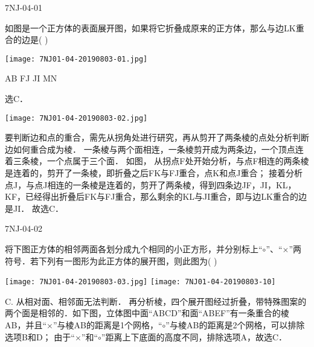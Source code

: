 
\begin{defproblem}{7NJ-04-01}%
\begin{onlyproblem}%
如图是一个正方体的表面展开图，如果将它折叠成原来的正方体，那么与边LK重合的边是(    ) 
\begin{center}
\texttt{[image: 7NJ01-04-20190803-01.jpg]}
\end{center}
\xx
{AB}
{FJ}
{JI}
{MN}
\end{onlyproblem}%
\begin{onlysolution}%
\begin{solution}%
选C．
\begin{center}
\texttt{[image: 7NJ01-04-20190803-02.jpg]}
\end{center}

要判断边和点的重合，需先从拐角处进行研究，再从剪开了两条棱的点处分析判断边如何重合成为棱． 一条棱与两个面相连，一条棱剪开成为两条边，一个顶点连着三条棱，一个点属于三个面． 如图，   从拐点F处开始分析，与点F相连的两条棱是连着的，剪开了一条棱，即折叠之后FK与FJ重合，点K和点J重合； 接着分析点J，与点J相连的一条棱是连着的，剪开了两条棱，得到四条边JF，JI，KL，KF，已经得出折叠后FK与FJ重合，那么剩余的KL与JI重合，即与边LK重合的边是JI． 故选C． 
\end{solution}%
\end{onlysolution}%
\end{defproblem}





\begin{defproblem}{7NJ-04-02}%
\begin{onlyproblem}%
将下图正方体的相邻两面各划分成九个相同的小正方形，并分别标上“$\circ$”、“$\times$”两符号．若下列有一图形为此正方体的展开图，则此图为(    ) 
\begin{center}
\texttt{[image: 7NJ01-04-20190803-03.jpg]}
\texttt{[image: 7NJ01-04-20190803-10]}
\end{center}
\end{onlyproblem}%
\begin{onlysolution}%
\begin{solution}%
C.
从相对面、相邻面无法判断． 再分析棱，四个展开图经过折叠，带特殊图案的两个面是相邻的．如下图，立体图中面“ABCD”和面“ABEF”有一条重合的棱AB，并且“$\times$”与棱AB的距离是1个网格，“$\circ$”与棱AB的距离是2个网格，可以排除选项B和D； 由于“$\times$”和“$\circ$”距离上下底面的高度不同，排除选项A，故选C． 

\end{solution}%
\end{onlysolution}%
\end{defproblem}



